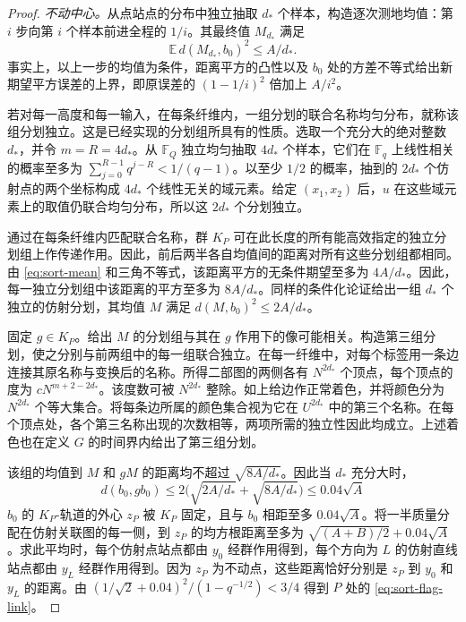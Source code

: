 \begin{proof}
\smallskip\noindent \emph{不动中心。}从点站点的分布中独立抽取 $d_*$ 个样本，构造逐次测地均值：第 $i$ 步向第 $i$ 个样本前进全程的 $1/i$。其最终值 $M_{d_*}$ 满足 \begin{equation}\label{eq:sort-mean}
                  \mathbb E\,d(M_{d_*},b_0)^2\le A/d_*.
\end{equation} 事实上，以上一步的均值为条件，距离平方的凸性以及 $b_0$ 处的方差不等式给出新期望平方误差的上界，即原误差的 $(1-1/i)^2$ 倍加上 $A/i^2$。

若对每一高度和每一输入，在每条纤维内，一组分划的联合名称均匀分布，就称该组分划独立。这是已经实现的分划组所具有的性质。选取一个充分大的绝对整数 $d_*$，并令 $m=R=4d_*$。从 $\mathbb F_Q$ 独立均匀抽取 $4d_*$ 个样本，它们在 $\mathbb F_q$ 上线性相关的概率至多为 $\sum_{j=0}^{R-1}q^{j-R}<1/(q-1)$。以至少 $1/2$ 的概率，抽到的 $2d_*$ 个仿射点的两个坐标构成 $4d_*$ 个线性无关的域元素。给定 $(x_1,x_2)$ 后，$u$ 在这些域元素上的取值仍联合均匀分布，所以这 $2d_*$ 个分划独立。

通过在每条纤维内匹配联合名称，群 $K_P$ 可在此长度的所有能高效指定的独立分划组上作传递作用。因此，前后两半各自均值间的距离对所有这些分划组都相同。由 \eqref{eq:sort-mean} 和三角不等式，该距离平方的无条件期望至多为 $4A/d_*$。因此，每一独立分划组中该距离的平方至多为 $8A/d_*$。同样的条件化论证给出一组 $d_*$ 个独立的仿射分划，其均值 $M$ 满足 $d(M,b_0)^2\le2A/d_*$。

固定 $g\in K_P$。给出 $M$ 的分划组与其在 $g$ 作用下的像可能相关。构造第三组分划，使之分别与前两组中的每一组联合独立。在每一纤维中，对每个标签用一条边连接其原名称与变换后的名称。所得二部图的两侧各有 $N^{2d_*}$ 个顶点，每个顶点的度为 $cN^{m+2-2d_*}$。该度数可被 $N^{2d_*}$ 整除。如上给边作正常着色，并将颜色分为 $N^{2d_*}$ 个等大集合。将每条边所属的颜色集合视为它在 $U^{2d_*}$ 中的第三个名称。在每个顶点处，各个第三名称出现的次数相等，两项所需的独立性因此均成立。上述着色也在定义 $G$ 的时间界内给出了第三组分划。

该组的均值到 $M$ 和 $gM$ 的距离均不超过 $\sqrt{8A/d_*}$。因此当 $d_*$ 充分大时，\[
 d(b_0,gb_0)\le 2\bigl(\sqrt{2A/d_*}+\sqrt{8A/d_*}\bigr)
                      \le 0.04\sqrt A
\] $b_0$ 的 $K_P$-轨道的外心 $z_P$ 被 $K_P$ 固定，且与 $b_0$ 相距至多 $0.04\sqrt A$。将一半质量分配在仿射关联图的每一侧，到 $z_P$ 的均方根距离至多为 $\sqrt{(A+B)/2}+0.04\sqrt A$。求此平均时，每个仿射点站点都由 $y_0$ 经群作用得到，每个方向为 $L$ 的仿射直线站点都由 $y_L$ 经群作用得到。因为 $z_P$ 为不动点，这些距离恰好分别是 $z_P$ 到 $y_0$ 和 $y_L$ 的距离。由 $(1/\sqrt2+0.04)^2/(1-q^{-1/2})<3/4$ 得到 $P$ 处的 \eqref{eq:sort-flag-link}。


\end{proof}
